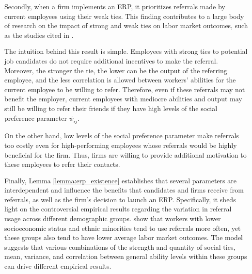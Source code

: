 \documentclass[12pt]{article}
\begin{document}

Secondly, when a firm implements an ERP, it prioritizes referrals made by current employees using their weak ties. This finding contributes to a large body of research on the impact of strong and weak ties on labor market outcomes, such as the studies cited in \cite{lin1981social, montgomery1992job, montgomery1994weak, granovetter1995coase, yakubovich2005weak, lester2021heterogeneous}.

The intuition behind this result is simple. Employees with strong ties to potential job candidates do not require additional incentives to make the referral. Moreover, the stronger the tie, the lower can be the output of the referring employee, and the less correlation is allowed between workers' abilities for the current employee to be willing to refer. Therefore, even if these referrals may not benefit the employer, current employees with mediocre abilities and output may still be willing to refer their friends if they have high levels of the social preference parameter $\psi_{ij}$.

On the other hand, low levels of the social preference parameter make referrals too costly even for high-performing employees whose referrals would be highly beneficial for the firm. Thus, firms are willing to provide additional motivation to these employees to refer their contacts. 

Finally, Lemma \ref{lemma:erp_existence} establishes that several parameters are interdependent and influence the benefits that candidates and firms receive from referrals, as well as the firm's decision to launch an ERP. Specifically, it sheds light on the controversial empirical results regarding the variation in referral usage across different demographic groups. \cite{holzer1987job, calvo2004effects, loury2006some, pellizzari2010friends,  lalanne2021social} show that workers with lower socioeconomic status and ethnic minorities tend to use referrals more often, yet these groups also tend to have lower average labor market outcomes. The model suggests that various combinations of the strength and quantity of social ties, mean, variance, and correlation between general ability levels within these groups can drive different empirical results.
\end{document}
